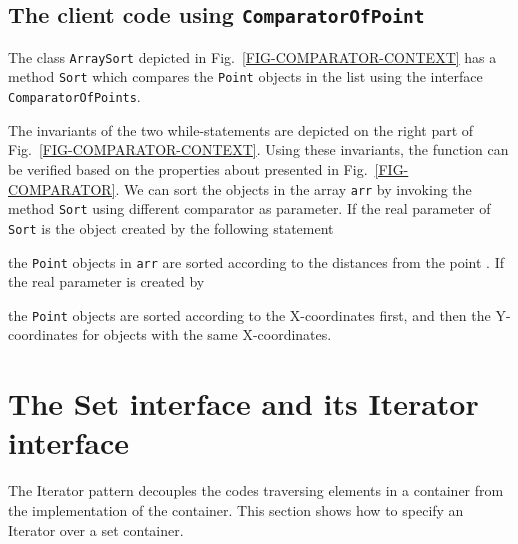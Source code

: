\documentclass[fleqn]{llncs}
\begin{document}
\subsection{The client code using \texttt{ComparatorOfPoint}}
The class \texttt{ArraySort} depicted in Fig.~\ref{FIG-COMPARATOR-CONTEXT} has a method \texttt{Sort} which compares
the \texttt{Point} objects in the list using the interface \texttt{ComparatorOfPoints}.

The invariants of the two while-statements are depicted on the right part of Fig.~\ref{FIG-COMPARATOR-CONTEXT}. Using these invariants, the function can be verified
based on the properties about  presented in Fig.~\ref{FIG-COMPARATOR}. We can sort the objects in the array \verb"arr" by invoking the method \texttt{Sort} using different comparator as parameter. If the real parameter of \texttt{Sort} is the object created by the following statement

the \texttt{Point} objects in \verb"arr" are sorted according to the distances from the point . If the real parameter is created by

the \texttt{Point} objects are sorted according to the X-coordinates first, and then the Y-coordinates for objects with the same X-coordinates.

\newpage
\section{The Set interface and its Iterator interface}\label{SEC-ITERATOR}
The Iterator pattern decouples the codes traversing elements in a container from the implementation of the container.
This section shows how to specify an Iterator over a set container.
\end{document}
